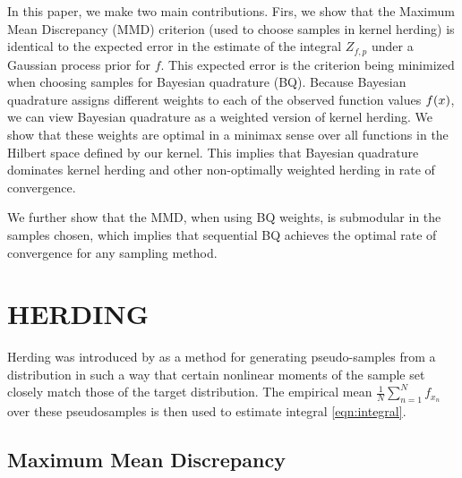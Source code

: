 \documentclass[]{article}
\begin{document}

In this paper, we make two main contributions.  Firs, we show that the Maximum Mean Discrepancy (MMD) criterion (used to choose samples in kernel herding) is identical to the expected error in the estimate of the integral $Z_{f,p}$ under a Gaussian process prior for $f$.  This expected error is the criterion being minimized when choosing samples for Bayesian quadrature (BQ).  Because Bayesian quadrature assigns different weights to each of the observed function values $f({x})$, we can view Bayesian quadrature as a weighted version of kernel herding.  
 We show that these weights are optimal in a minimax sense over all functions in the Hilbert space defined by our kernel.  This implies that Bayesian quadrature dominates kernel herding and other non-optimally weighted herding in rate of convergence.

We further show that the MMD, when using BQ weights, is submodular in the samples chosen, which implies that sequential BQ achieves the optimal rate of convergence for any sampling method.

\section{HERDING} 

Herding was introduced by \cite{welling2009herding} as a method for generating pseudo-samples from a distribution in such a way that certain nonlinear moments of the sample set closely match those of the target distribution.  The empirical mean $\frac{1}{N}\sum_{n=1}^{N}f_{x_n}$ over these pseudosamples is then used to estimate integral \eqref{eqn:integral}.

\subsection{Maximum Mean Discrepancy}
\end{document}
